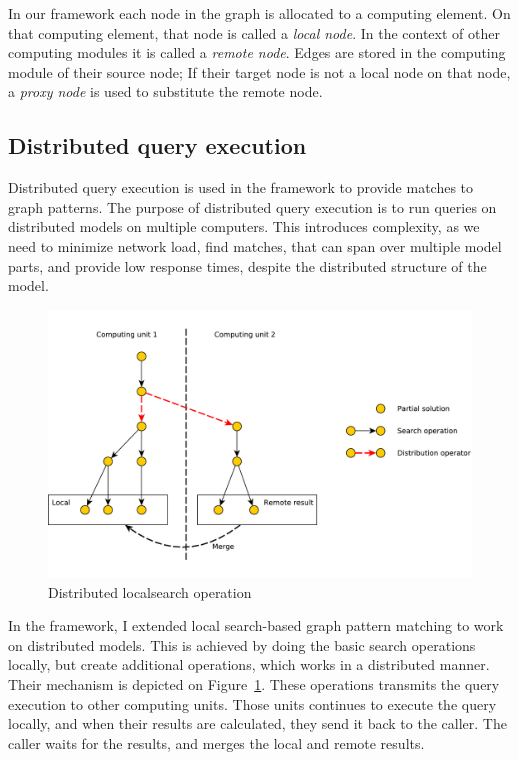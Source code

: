 In our framework each node in the graph is allocated to a computing element. 
On that computing element, that node is called a \emph{local node}. 
In the context of other computing modules it is called a \emph{remote node}. 
Edges are stored in the computing module of their source node; 
If their target node is not a local node on that node, a \emph{proxy node} is used to substitute the remote node.


\subsection{Distributed query execution}

Distributed query execution is used in the framework to provide matches to graph patterns.
The purpose of distributed query execution is to run queries on distributed models on multiple computers. 
This introduces complexity, as we need to minimize network load, find matches, that can span over multiple model parts, and provide low response times, despite the distributed structure of the model.


\begin{figure}[h]
	\begin{center}
		\includegraphics[width=\textwidth]{figures/distributed-ls.pdf}
		\caption{Distributed localsearch operation}
		\label{fig:distributed-ls}
	\end{center}
\end{figure}

In the framework, I extended local search-based graph pattern matching to work on distributed models.
This is achieved by doing the basic search operations locally, but create additional operations, which works in a distributed manner. 
Their mechanism is depicted on Figure~\ref{fig:distributed-ls}.
These operations transmits the query execution to other computing units.
Those units continues to execute the query locally, and when their results are calculated, they send it back to the caller.
The caller waits for the results, and merges the local and remote results.

